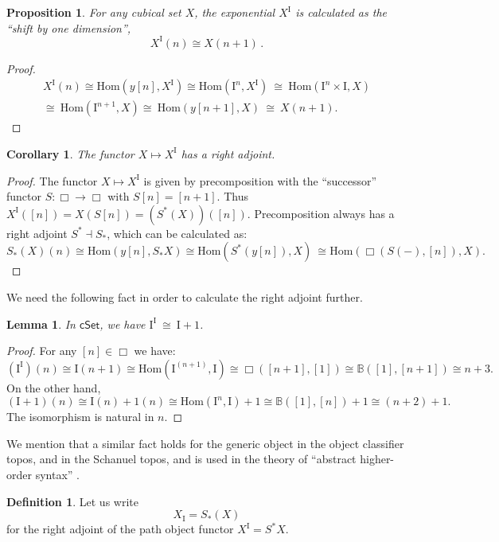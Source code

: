 \documentclass[12pt]{article}
\newcommand{\B}{\ensuremath{\mathbb{B}}}
\newcommand{\cSet}{\ensuremath{\mathsf{cSet}}}
\newcommand{\Hom}{\ensuremath{\mathrm{Hom}}}
\renewcommand{\hom}{\ensuremath{\mathrm{Hom}}}
\renewcommand{\to}{\ensuremath{\rightarrow}}
\newcommand{\I}{\ensuremath{\mathrm{I}}}
\renewcommand{\H}{\ensuremath{\Box}}
\newcommand{\HH}{\ensuremath{\cSet}}
\newtheorem{proposition}[theorem]{Proposition}
\newtheorem{lemma}[theorem]{Lemma}
\newtheorem{corollary}[theorem]{Corollary}
\theoremstyle{remark}
\theoremstyle{definition}
\newtheorem{definition}[theorem]{Definition}
\begin{document}
\begin{proposition}\label{prop:pathobject}
For any cubical set $X$, the exponential $X^\I$ is calculated as the ``shift by one dimension'', 
\[
X^\I(n) \cong X(n+1)\,.
\]
\end{proposition}

\begin{proof}
\[
\begin{split}
X^\I(n) \cong \hom(y[n], X^\I) \cong \hom(\I^n, X^\I)\ \cong\ \hom(\I^n\times \I, X)\\
\cong\ \hom(\I^{n+1}, X)\cong\ \hom(y[n+1], X)\ \cong\ X(n+1).
\end{split}
\]
\end{proof}

\begin{corollary}\label{cor:rightadjpath}
The functor $X \mapsto X^\I$ has a \emph{right} adjoint.
\end{corollary}
\begin{proof}
The functor $X \mapsto X^\I$ is given by precomposition with the ``successor'' functor $S : \H\to\H$ with $S[n] = [n+1]$.  Thus $X^\I([n]) = X(S[n]) = (S^*(X))([n])$.  Precomposition always has a right adjoint $S^* \dashv S_*$, which can be calculated as:
\[
S_*(X)(n) \cong \hom(y[n], S_*X) \cong \hom(S^*(y[n]), X)\ \cong \hom(\H(S(-), [n]), X).
\]
\end{proof}

We need the following fact in order to calculate the right adjoint further.

\begin{lemma}\label{lemma:binomial}
In $\HH$, we have $\I^\I\ \cong\ \I+1$.
\end{lemma}
\begin{proof}
For any $[n] \in \H$ we have:
\[
(\I^\I)(n) \cong \I(n+1) \cong \Hom(\I^{(n+1)},\I)\cong \H([n+1],[1])\cong \B([1], [n+1])\cong n+3.
\]
On the other hand,
\[
(\I+1)(n) \cong \I(n) + 1(n) \cong \Hom(\I^n, \I) + 1 \cong \B([1],[n]) +1 \cong (n+2) +1.
\]
The isomorphism is natural in $n$.
\end{proof}
%
We mention that a similar fact holds for the generic object in the object classifier topos, and in the Schanuel topos, and is used in the theory of ``abstract higher-order syntax'' \cite{Pitts,Fiore}.


\begin{definition}
Let us write
\[
X_\I = S_*(X)
\]
for the right adjoint of the path object functor $X^\I = S^*X$.
\end{definition}
\end{document}
